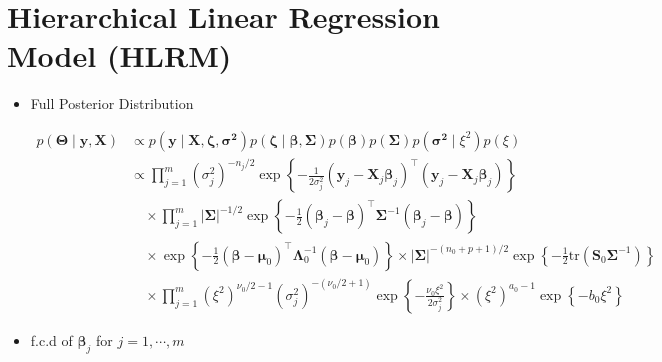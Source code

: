 \begin{appendix}
\begin{itemize}
\end{itemize}

\newpage

\section{Hierarchical Linear Regression Model (HLRM)}

\begin{itemize}

\item Full Posterior Distribution

\begin{equation}
\begin{split}
p(\bm{\Theta} \mid\bm{y}, \bm{X}) 
&\propto p(\bm{y} \mid \bm{X}, \bm{\zeta} ,\bm{\sigma^2}) 
p(\bm{\zeta} \mid \bm{\beta}, \bm{\Sigma}) 
p(\bm{\beta}) 
p(\bm{\Sigma}) 
p(\bm{\sigma^2}\mid 
\xi^2)
p(\xi) \\
&\propto \prod_{j=1}^{m}  ({\sigma}_j^2)^{-n_j/2} 
\exp\left\{ -\frac{1}{2\sigma_j^2} (\bm{y}_{j} - \bm{X}_{j} \bm{\beta}_j)^\top(\bm{y}_{j} - \bm{X}_{j} \bm{\beta}_j) \right\} \\
&\quad\times \prod_{j=1}^{m} \left| \bm{\Sigma} \right|^{-1/2} 
\exp\left\{ -\frac{1}{2} (\bm{\beta}_j -  \bm{\beta})^\top \bm{\Sigma}^{-1} (\bm{\beta}_j - \bm{\beta}) \right\} \\
&\quad \times \exp\left\{ -\frac{1}{2} (\bm{\beta} - \bm{\mu}_0)^\top \bm{\Lambda}_0^{-1} (\bm{\beta} - \bm{\mu}_0) \right\}
\times |\bm{\Sigma}|^{-(n_0 + p + 1)/2} 
 \exp\left\{ -\frac{1}{2} \mathrm{tr}(\bm{S}_0 \bm{\Sigma}^{-1}) \right\} \\
&\quad \times \prod_{j=1}^{m} (\xi^2)^{\nu_0 / 2 - 1} 
(\sigma_j^2)^{-(\nu_0 / 2+1)} 
\exp\left\{ -\frac{\nu_0 \xi^2}{2 \sigma_j^2} \right\} 
\times (\xi^2)^{a_0 - 1} \exp\left\{ -b_0 \xi^2 \right\}
\end{split}
\end{equation}

\item f.c.d of $\bm{\beta}_j$ for $j=1,\cdots,m$


\end{itemize}
\end{appendix}
